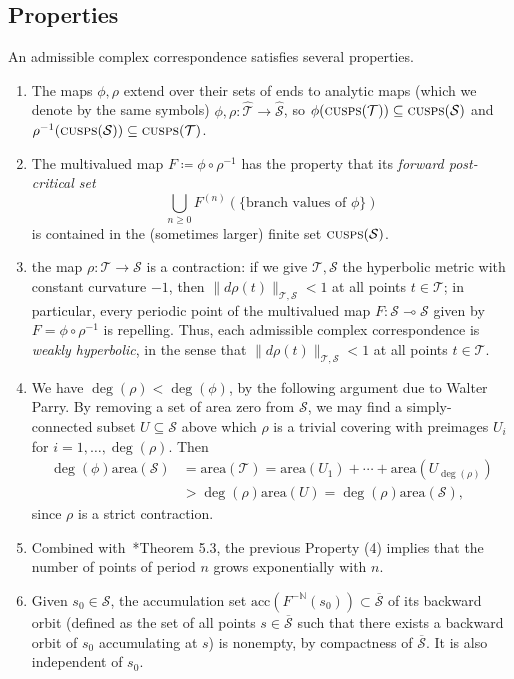 \documentclass{amsart}
\newcommand\N{{\mathbb{N}}}
\theoremstyle{definition}
\theoremstyle{remark}
\newcommand{\cT}{\mathcal{T}}
\newcommand{\cS}{\mathcal{S}}
\newcommand{\cusps}[1]{\text{\sc cusps}(#1)}
\begin{document}
\subsection{Properties}
An admissible complex  correspondence satisfies several properties.
\begin{enumerate}
\item The maps $\phi, \rho$ extend over their sets of ends to analytic maps (which we denote by the same symbols) $\phi, \rho\colon \widehat{\cT}\to\widehat{\cS}$, so $\phi(\cusps{\cT}) \subseteq \cusps{\cS}$ and $\rho^{-1}(\cusps{\cS}) \subseteq \cusps{\cT}$.
\item The multivalued map $F\coloneqq\phi \circ \rho^{-1}$ has the property that its \emph{forward post-critical set} 
\[\bigcup_{n \geq 0} F^{(n)}(\{\text{branch values of }\phi\})\]
is contained in the (sometimes larger) finite set $\cusps{\cS}$.
\item  the map $\rho\colon \cT\to\cS$ is a    contraction: if we give $\cT,\cS$ the hyperbolic metric with constant curvature $-1$, then $\|d\rho(t)\|_{\cT, \cS}<1$ at all points $t\in \cT$; in particular, every periodic point of the multivalued map $F\colon \cS \multimap \cS$ given by $F=\phi\circ\rho^{-1}$ is repelling. Thus, each admissible complex correspondence is \emph{weakly hyperbolic}, in the sense that $\|d\rho(t)\|_{\cT, \cS}<1$ at all points $t\in \cT$.

\item We have $\deg(\rho) < \deg(\phi)$, by the following argument due to Walter Parry. By removing a set of area zero from $\cS$, we may find a simply-connected subset $U\subseteq\cS$ above which $\rho$ is a trivial covering with preimages $U_i$ for $i=1,\ldots,\deg(\rho)$. Then
  \begin{align*}
    \deg(\phi)\text{area}(\cS)&=\text{area}(\cT)=\text{area}(U_1)+\cdots +\text{area}(U_{\deg(\rho)})\\&>\deg(\rho)\text{area}(U)
    =\deg(\rho)\text{area}(\cS),
  \end{align*}
  since $\rho$ is a strict contraction.
  
\item Combined with~\cite{MR3667901}*{Theorem 5.3}, the previous Property (4) implies that the number of points of period $n$ grows exponentially with $n$. 

\item Given $s_0\in \cS$, the accumulation set $\text{acc}(F^{-\N}(s_0)) \subset \overline{\cS}$ of its    backward orbit (defined as the set of all points $s\in \overline{\cS}$ such that there exists a backward orbit of $s_0$ accumulating at $s$) is nonempty, by compactness of $\overline{\cS}$.   It is also independent of $s_0$.


\end{enumerate}
\end{document}
